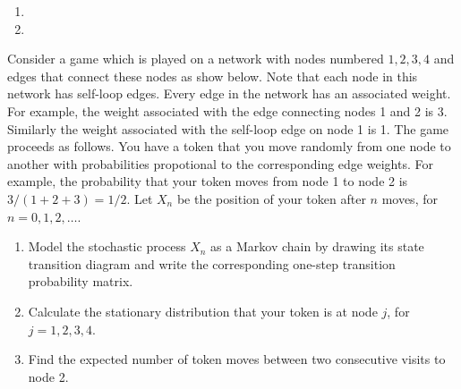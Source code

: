 \begin{solution}[Solution]
\begin{enumerate}[label=(\alph*)]
    \item 
    \item 
\end{enumerate}
\end{solution}


\begin{problem}
Consider a game which is played on a network with nodes numbered \( 1, 2, 3, 4 \) and edges that connect these nodes as show below. Note that each node in this network has self-loop edges. Every edge in the network has an associated weight. For example, the weight associated with the edge connecting nodes 1 and 2 is 3. Similarly the weight associated with the self-loop edge on node 1 is 1. The game proceeds as follows. You have a token that you move randomly from one node to another with probabilities propotional to the corresponding edge weights. For example, the probability that your token moves from node 1 to node 2 is \( 3/(1 + 2 + 3) = 1/2 \). Let \( X_n \) be the position of your token after \( n \) moves, for \( n = 0, 1, 2, \ldots \).
\begin{center}
\end{center}
\begin{enumerate}[nolistsep,label=(\alph*)]
    \item Model the stochastic process \( X_n \) as a Markov chain by drawing its state transition diagram and write the corresponding one-step transition probability matrix.
    \item Calculate the stationary distribution that your token is at node \( j \), for \( j = 1, 2, 3, 4 \).
    \item Find the expected number of token moves between two consecutive visits to node 2.
\end{enumerate}
\end{problem}

